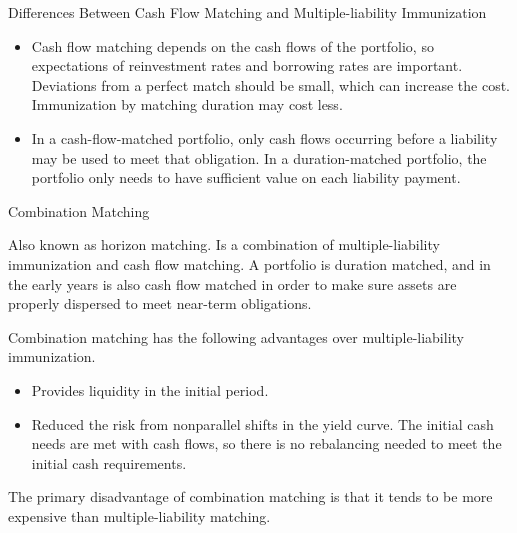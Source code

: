 \documentclass[../custom]{flashcards}
\begin{document}
\begin{flashcard}{Differences Between Cash Flow Matching and Multiple-liability Immunization}
    \begin{itemize}
        \item Cash flow matching depends on the cash flows of the portfolio, so expectations of reinvestment rates and borrowing rates are important. Deviations from a perfect match should be small, which can increase the cost. Immunization by matching duration may cost less.
        \item In a cash-flow-matched portfolio, only cash flows occurring before a liability may be used to meet that obligation. In a duration-matched portfolio, the portfolio only needs to have sufficient value on each liability payment.
    \end{itemize}
\end{flashcard}

\begin{flashcard}{Combination Matching}
    \begin{flushleft}
    Also known as horizon matching. Is a combination of multiple-liability immunization and cash flow matching. A portfolio is duration matched, and in the early years is also cash flow matched in order to make sure assets are properly dispersed to meet near-term obligations.\newline

    Combination matching has the following advantages over multiple-liability immunization.
    \begin{itemize}
        \item Provides liquidity in the initial period.
        \item Reduced the risk from nonparallel shifts in the yield curve. The initial cash needs are met with cash flows, so there is no rebalancing needed to meet the initial cash requirements.
    \end{itemize}
    The primary disadvantage of combination matching is that it tends to be more expensive than multiple-liability matching.
    \end{flushleft}
\end{flashcard}
\end{document}
